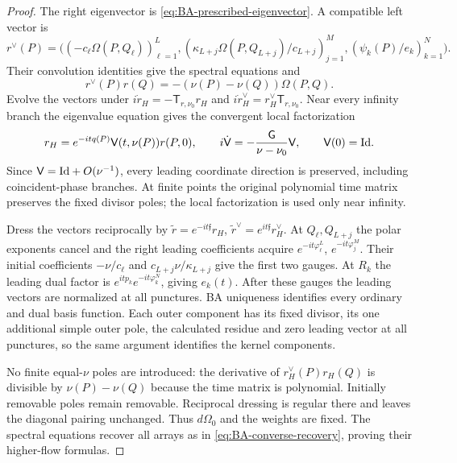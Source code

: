 \begin{proof}
The right eigenvector is \cref{eq:BA-prescribed-eigenvector}.
A compatible left vector is
\[
 r^{\vee}(P)=\bigl((-c_{\ell}\Omega(P,Q_{\ell}))_{\ell=1}^{L},
 (\kappa_{L+j}\Omega(P,Q_{L+j})/c_{L+j})_{j=1}^{M},
 (\psi_k(P)/e_k)_{k=1}^{N}\bigr).
\]
Their convolution identities give the spectral equations and
\begin{equation}\label{eq:BA-higher-initial-kernel}
 r^{\vee}(P)r(Q)=-(\nu(P)-\nu(Q))\Omega(P,Q).
\end{equation}
Evolve the vectors under
$i\dot r_H=-\mathsf T_{r,\nu_0}r_H$ and
$i\dot r_H^{\vee}=r_H^{\vee}\mathsf T_{r,\nu_0}$.
Near every infinity branch the eigenvalue equation gives the
convergent local factorization
\begin{equation}\label{eq:BA-higher-local-factorization}
 r_H=e^{-itq(P)}\mathsf V(t,\nu(P))r(P,0),\qquad
 i\dot{\mathsf V}=-\frac{\mathsf G}{\nu-\nu_0}\mathsf V,\qquad
 \mathsf V(0)=\mathrm{Id}.
\end{equation}
Since $\mathsf V=\mathrm{Id}+O(\nu^{-1})$, every leading coordinate direction
is preserved, including coincident-phase branches. At finite points
the original polynomial time matrix preserves the fixed divisor
poles; the local factorization is used only near infinity.

Dress the vectors reciprocally by
$\widetilde r=e^{-it\mathfrak f}r_H$,
$\widetilde r^{\vee}=e^{it\mathfrak f}r_H^{\vee}$.
At $Q_{\ell},Q_{L+j}$ the polar exponents cancel and the right leading
coefficients acquire $e^{-it\varphi_{\ell}^L}$,
$e^{-it\varphi_j^M}$. Their initial coefficients
$-\nu/c_{\ell}$ and $c_{L+j}\nu/\kappa_{L+j}$ give the first two gauges.
At $R_k$ the leading dual factor is
$e^{itp_k}e^{-it\varphi_k^N}$, giving $e_k(t)$.
After these gauges the leading vectors are normalized at all
punctures. BA uniqueness identifies every ordinary and dual basis
function. Each outer component has its fixed divisor, its one
additional simple outer pole, the calculated residue and zero
leading vector at all punctures, so the same argument identifies
the kernel components.

No finite equal-$\nu$ poles are introduced: the derivative of
$r_H^{\vee}(P)r_H(Q)$ is divisible by $\nu(P)-\nu(Q)$ because the
time matrix is polynomial. Initially removable poles remain
removable. Reciprocal dressing is regular there and leaves the
diagonal pairing unchanged. Thus $d\Omega_0$ and the weights are
fixed. The spectral equations recover all arrays as in
\cref{eq:BA-converse-recovery}, proving their higher-flow formulas.


\end{proof}
